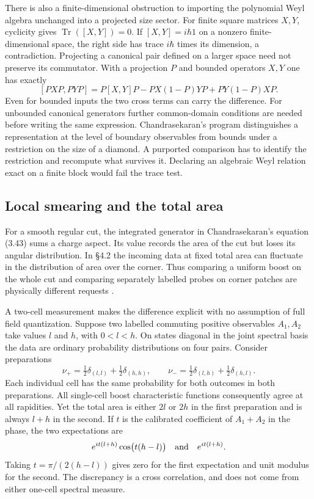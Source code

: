 \documentclass[11pt,letterpaper]{article}
\begin{document}
There is also a finite-dimensional obstruction to importing the polynomial Weyl algebra
unchanged into a projected size sector. For finite square matrices $X,Y$, cyclicity gives
$\operatorname{Tr}([X,Y])=0$. If $[X,Y]=i\hbar 1$ on a nonzero finite-dimensional space, the
right side has trace $i\hbar$ times its dimension, a contradiction. Projecting a canonical pair
defined on a larger space need not preserve its commutator. With a projection $P$ and bounded
operators $X,Y$ one has exactly
\[
 [PXP,PYP]=P[X,Y]P-PX(1-P)YP+PY(1-P)XP .
\]
Even for bounded inputs the two cross terms can carry the difference. For unbounded canonical
generators further common-domain conditions are needed before writing the same expression.
Chandrasekaran's program distinguishes a representation at the level of boundary observables
from bounds under a restriction on the size of a diamond. A purported comparison has to
identify the restriction and recompute what survives it. Declaring an algebraic Weyl relation
exact on a finite block would fail the trace test.

\subsection{Local smearing and the total area}
For a smooth regular cut, the integrated generator in Chandrasekaran's equation (3.43) sums a
charge aspect. Its value records the area of the cut but loses its angular distribution. In
\S4.2 the incoming data at fixed total area can fluctuate in the distribution of area over the
corner. Thus comparing a uniform boost on the whole cut and comparing separately labelled
probes on corner patches are physically different requests \cite{nc}.

A two-cell measurement makes the difference explicit with no assumption of full field
quantization. Suppose two labelled commuting positive observables $A_1,A_2$ take values $l$ and
$h$, with $0<l<h$. On states diagonal in the joint spectral basis the data are ordinary
probability distributions on four pairs. Consider preparations
\[
 \nu_+=\tfrac12\delta_{(l,l)}+\tfrac12\delta_{(h,h)},\qquad
 \nu_-=\tfrac12\delta_{(l,h)}+\tfrac12\delta_{(h,l)} .
\]
Each individual cell has the same probability for both outcomes in both preparations. All
single-cell boost characteristic functions consequently agree at all rapidities. Yet the total
area is either $2l$ or $2h$ in the first preparation and is always $l+h$ in the second. If $t$
is the calibrated coefficient of $A_1+A_2$ in the phase, the two expectations are
\[
 e^{it(l+h)}\cos\bigl(t(h-l)\bigr)
 \quad\hbox{and}\quad e^{it(l+h)}.
\]
Taking $t=\pi/(2(h-l))$ gives zero for the first expectation and unit modulus for the second.
The discrepancy is a cross correlation, and does not come from either one-cell spectral
measure.
\end{document}
